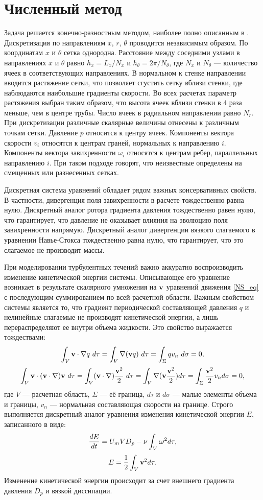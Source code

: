 \section{Численный метод} \label{num_method}

Задача решается конечно-разностным методом, наиболее полно описанным в \cite{Nikitin2006}. Дискретизация по направлениям $x$, $r$, $\theta$ проводится независимым образом. По координатам $x$ и $\theta$ сетка однородна. Расстояние между соседними узлами в направлениях $x$ и $\theta$ равно $h_x = L_x / N_x$ и $h_\theta  = 2 \pi / N_\theta$, где $N_x$ и $N_\theta$ --- количество ячеек в соответствующих направлениях. В нормальном к стенке направлении вводится растяжение сетки, что позволяет сгустить сетку вблизи стенки, где наблюдаются наибольшие градиенты скорости. Во всех расчетах параметр растяжения выбран таким образом, что высота ячеек вблизи стенки в 4 раза меньше, чем в центре трубы. Число ячеек в радиальном направлении равно $N_r$. При дискретизации различные скалярные величины отнесены к различным точкам сетки. Давление $p$ относится к центру ячеек. Компоненты вектора скорости $v_i$ относятся к центрам граней, нормальных к направлению $i$. Компоненты вектора завихренности $\omega_i$ относятся к центрам ребер, параллельных направлению $i$. При таком подходе говорят, что неизвестные определены на смещенных или разнесенных сетках. 

Дискретная система уравнений обладает рядом важных консервативных свойств. В частности, дивергенция поля завихренности в расчете тождественно равна нулю. Дискретный аналог ротора градиента давления тождественно равен нулю, что гарантирует, что давление не оказывает влияния на эволюцию поля завихренности напрямую. Дискретный аналог дивергенции вязкого слагаемого в уравнении Навье-Стокса тождественно равна нулю, что гарантирует, что это слагаемое не производит массы. 

При моделировании турбулентных течений важно аккуратно воспроизводить изменение кинетической энергии системы. Описывающее его уравнение возникает в результате скалярного умножения на $\mathbf{v}$ уравнений движения \eqref{NS_eq} с последующим суммированием по всей расчетной области. Важным свойством системы является то, что градиент периодической составляющей давления $q$ и нелинейные слагаемые не производят кинетической энергии, а лишь перераспределяют ее внутри объема жидкости. Это свойство выражается тождествами:
$$
\int_V \v \cdot \grad q\ d\tau= \int_V \grad (\v q)\ d\tau = \int_{\Sigma} q v_n\ d\sigma = 0, 
$$
$$
\int_V \mathbf{v} \cdot (\mathbf{v} \cdot \nabla) \mathbf{v}\ d\tau = \int_V (\mathbf{v} \cdot \nabla)\frac{\mathbf{v}^2}{2}\ d\tau = \int_V \nabla (\mathbf{v} \frac{\mathbf{v}^2}{2}) d\tau = \int_{\Sigma} \frac{\mathbf{v}^2}{2} v_n d\sigma = 0,
$$
где $V$ --- расчетная область, $\Sigma$ --- её граница, $d\tau$ и $d\sigma$ --- малые элементы объема и границы, $v_n$ --- нормальная составляющая скорости на границе. Строго выполняется дискретный аналог уравнения изменения кинетической энергии $E$, записанного в виде:
\begin{equation} \label{Eeq}
\frac{d E}{d t} = U_mVD_p - \nu \int_{V} \mbox{\boldmath$\omega$}^2 d\tau,
\end{equation}
$$
E = \frac{1}{2}\int_{V} \mathbf{v}^2 d\tau.
$$
Изменение кинетической энергии происходит за счет внешнего градиента давления $D_p$ и вязкой диссипации. 

